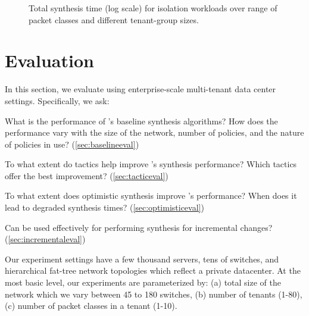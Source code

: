 \begin{figure*}
	\centering
	\caption{\label{fig:isolation}
		Total synthesis time (log scale) for isolation workloads over range of packet classes and different tenant-group sizes.}
\end{figure*}

\section{Evaluation}
In this section, we evaluate \Name using 
enterprise-scale multi-tenant data
center settings. 
Specifically, we ask:

\begin{compactitemize}

\item What is the performance of \Name's baseline synthesis
  algorithms? How does the performance vary with the size of the
  network, number of policies, and the nature of policies in use? (\cref{sec:baselineeval})

\item To what extent do tactics help improve \Name's synthesis
  performance? Which tactics offer the best improvement? (\cref{sec:tacticeval})

\item To what extent does optimistic synthesis improve \Name's
  performance? When does it lead to degraded synthesis times? (\cref{sec:optimisticeval})

\item Can \Name be used effectively for performing synthesis for
incremental changes?  (\cref{sec:incrementaleval})

\end{compactitemize}
Our experiment settings have a few thousand servers, tens of
switches, and hierarchical fat-tree network topologies which reflect
a private datacenter. At the
most basic level, our experiments are parameterized by: (a) total size
of the network which we vary between 45 to 180 switches, (b) number of
tenants (1-80), (c) number of packet classes in a tenant (1-10). 

